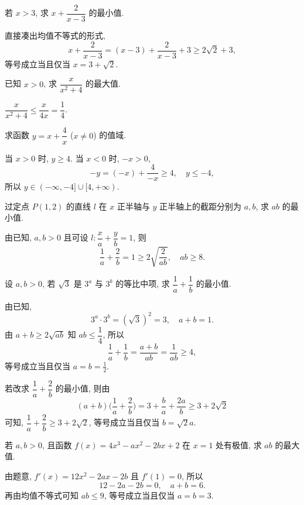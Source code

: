 \begin{exercise}
    若 $x>3$, 求 $x+\dfrac2{x-3}$ 的最小值.
\end{exercise}
\beginsolution
    直接凑出均值不等式的形式,
    \[x+\frac2{x-3}= (x-3)+\dfrac2{x-3}+3
    \geqslant 2\sqrt2+3,\]
    等号成立当且仅当 $x=3+\sqrt2$.
\endsolution

\begin{exercise}
    已知 $x>0$, 求 $\dfrac{x}{x^2+4}$ 的最大值.
\end{exercise}
\beginsolution
    $\dfrac{x}{x^2+4}\leqslant \dfrac{x}{4x}= \dfrac14$.
\endsolution

\begin{exercise}
    求函数 $y=x+\dfrac4x$ ($x\neq0$) 的值域.
\end{exercise}
\beginsolution
    当 $x>0$ 时, $y\geqslant 4$. 当 $x<0$ 时, $-x>0$,
    \[-y= (-x)+ \frac4{-x}\geqslant 4,\quad y\leqslant -4,\]
    所以 $y\in (-\infty,-4]\cup [4,+\infty)$.
\endsolution

\begin{exercise}
    过定点 $P(1,2)$ 的直线 $l$ 在 $x$ 正半轴与 $y$ 正半轴上的截距分别为 $a,b$, 求 $ab$ 的最小值.
\end{exercise}
\beginsolution
    由已知, $a,b>0$ 且可设 $l\colon \dfrac{x}a+ \dfrac{y}b= 1$, 则
    \[\frac1a+ \frac2b= 1\geqslant 2\sqrt{\frac2{ab}},\quad
    ab\geqslant 8.\]
\endsolution

\begin{exercise}
    设 $a,b>0$, 若 $\sqrt3$ 是 $3^a$ 与 $3^b$ 的等比中项, 求 $\dfrac1a +\dfrac1b$ 的最小值.
\end{exercise}
\beginsolution
    由已知,
    \[3^a\cdot 3^b= (\sqrt3)^2= 3,\quad a+b=1.\]
    由 $a+b\geqslant 2\sqrt{ab}$ 知 $ab\leqslant \dfrac14$, 所以
    \[\frac1a+\frac1b= \frac{a+b}{ab}
    = \frac{1}{ab}\geqslant 4,\]
    等号成立当且仅当 $a=b= \frac12$.

    \varexercise 若改求 $\dfrac1a+ \dfrac2b$ 的最小值, 则由
    \[(a+b)\biggl(\frac1a+\frac2b\biggr)
    = 3+\frac{b}{a}+ \frac{2a}{b}\geqslant 3+2\sqrt2\]
    可知, $\dfrac1a+ \dfrac2b\geqslant 3+2\sqrt2$, 等号成立当且仅当 $b=\sqrt2a$.
\endsolution

\begin{exercise}
    若 $a,b>0$, 且函数 $f(x)=4x^3 -ax^2 -2bx+2$ 在 $x=1$ 处有极值, 求 $ab$ 的最大值.
\end{exercise}
\beginsolution
    由题意, $f'(x)= 12x^2- 2ax- 2b$ 且 $f'(1)= 0$, 所以
    \[12- 2a- 2b= 0,\quad a+b= 6.\]
    再由均值不等式可知 $ab\leqslant 9$, 等号成立当且仅当 $a=b=3$.
\endsolution

